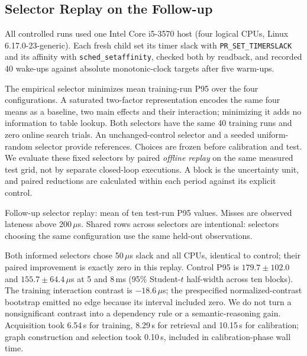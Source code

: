 \subsection{Selector Replay on the Follow-up}
All controlled runs used one Intel Core i5-3570 host (four logical CPUs, Linux 6.17.0-23-generic). Each fresh child set its timer slack with \texttt{PR\_SET\_TIMERSLACK} and its affinity with \texttt{sched\_setaffinity}, checked both by readback, and recorded 40 wake-ups against absolute monotonic-clock targets after five warm-ups.

The empirical selector minimizes mean training-run P95 over the four configurations. A saturated two-factor representation encodes the same four means as a baseline, two main effects and their interaction; minimizing it adds no information to table lookup. Both selectors have the same 40 training runs and zero online search trials. An unchanged-control selector and a seeded uniform-random selector provide references. Choices are frozen before calibration and test. We evaluate these fixed selectors by paired \emph{offline replay} on the same measured test grid, not by separate closed-loop executions. A block is the uncertainty unit, and paired reductions are calculated within each period against its explicit control.

\begin{table}[t]
\centering\small
\caption{Follow-up selector replay: mean of ten test-run P95 values. Misses are observed lateness above 200\,$\mu$s. Shared rows across selectors are intentional: selectors choosing the same configuration use the same held-out observations.}
\label{tab:controlled-selectors}
\begin{adjustbox}{max width=\columnwidth}
\begin{adjustbox}{max width=\columnwidth}

\end{adjustbox}
\end{adjustbox}
\end{table}

Both informed selectors chose 50\,$\mu$s slack and all CPUs, identical to control; their paired improvement is exactly zero in this replay. Control P95 is $179.7\pm102.0$ and $155.7\pm64.4\,\mu$s at 5 and 8\,ms (95\% Student-$t$ half-width across ten blocks). The training interaction contrast is $-18.6\,\mu$s; the prespecified normalized-contrast bootstrap emitted no edge because its interval included zero. We do not turn a nonsignificant contrast into a dependency rule or a semantic-reasoning gain. Acquisition took 6.54\,s for training, 8.29\,s for retrieval and 10.15\,s for calibration; graph construction and selection took 0.10\,s, included in calibration-phase wall time.

